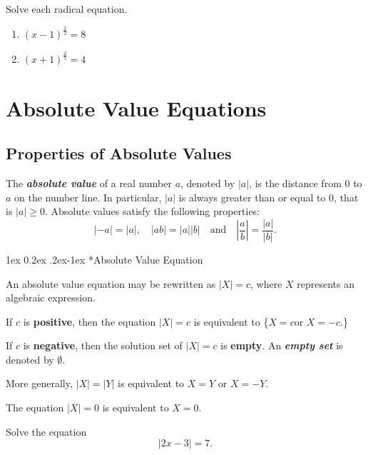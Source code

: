 \documentclass[en,12pt]{elegantbook}
\makeatletter
\providecommand{\tightlist}{%
  \setlength{\itemsep}{0pt}\setlength{\parskip}{0pt}}
\renewcommand{\paragraph}{%
  \@startsection{paragraph}{4}%
  {\z@}{1ex \@plus 0.2ex \@minus .2ex}{-1ex}%
  {\normalfont\large\bfseries}%
}
\let\BeginKnitrBlock\begin \let\EndKnitrBlock\end
\makeatother
\begin{document}
\BeginKnitrBlock{exercise}
\protect\hypertarget{exr:unnamed-chunk-197}{}{\label{exr:unnamed-chunk-197} }
Solve each radical equation.

\begin{enumerate}
\def\labelenumi{\arabic{enumi}.}
\tightlist
\item
  \((x-1)^{\frac32}=8\)
\item
  \((x+1)^{\frac23}=4\)
\end{enumerate}
\EndKnitrBlock{exercise}

\hypertarget{absolute-value-equations}{%
\chapter{Absolute Value Equations}\label{absolute-value-equations}}

\hypertarget{properties-of-absolute-values}{%
\section{Properties of Absolute Values}\label{properties-of-absolute-values}}

The \textbf{\emph{absolute value}} of a real number \(a\), denoted by \(|a|\), is the distance from \(0\) to \(a\) on the number line. In particular, \(|a|\) is always greater than or equal to \(0\), that is \(|a|\geq 0\). Absolute values satisfy the following properties:
\[
|-a|=|a|, \quad |ab|=|a||b| \quad \text{and} \quad \left|\frac{a}{b}\right|=\frac{|a|}{|b|}.
\]

\paragraph*{Absolute Value Equation}

An absolute value equation may be rewritten as \(|X|=c\), where \(X\) represents an algebraic expression.

If \(c\) is \textbf{positive}, then the equation \(|X|=c\) is equivalent to \{\(X=c\)\quad or \quad \(X=-c\).\}

If \(c\) is \textbf{negative}, then the solution set of \(|X|=c\) is \textbf{empty}.
An \textbf{\emph{empty set}} is denoted by \(\emptyset\).

More generally, \(|X|=|Y|\) is equivalent to \(X=Y\) or \(X=-Y\).

The equation \(|X|=0\) is equivalent to \(X=0\).

\BeginKnitrBlock{example}
\protect\hypertarget{exm:unnamed-chunk-198}{}{\label{exm:unnamed-chunk-198} }
Solve the equation
\[|2x-3|=7.\]
\EndKnitrBlock{example}
\end{document}
